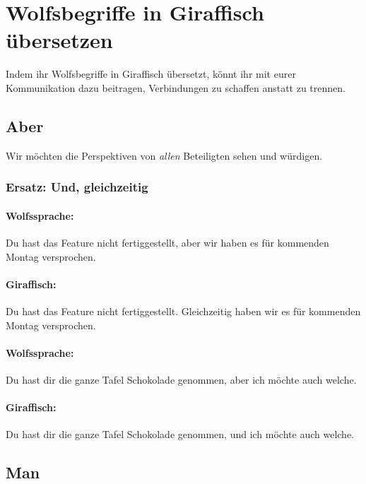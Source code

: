 \section{Wolfsbegriffe in Giraffisch übersetzen}
\label{wolfsbegriffe-ersetzen}

Indem ihr Wolfsbegriffe in Giraffisch übersetzt, könnt ihr mit eurer Kommunikation dazu beitragen, Verbindungen zu schaffen anstatt zu trennen.

\subsection{Aber}

Wir möchten die Perspektiven von \emph{allen} Beteiligten sehen und würdigen.

\subsubsection{Ersatz: Und, gleichzeitig}

\paragraph{Wolfssprache:} Du hast das Feature nicht fertiggestellt, aber wir haben es für kommenden Montag versprochen.

\paragraph{Giraffisch:} Du hast das Feature nicht fertiggestellt. Gleichzeitig haben wir es für kommenden Montag versprochen.

\paragraph{Wolfssprache:} Du hast dir die ganze Tafel Schokolade genommen, aber ich möchte auch welche.

\paragraph{Giraffisch:} Du hast dir die ganze Tafel Schokolade genommen, und ich möchte auch welche.

\subsection{Man}

